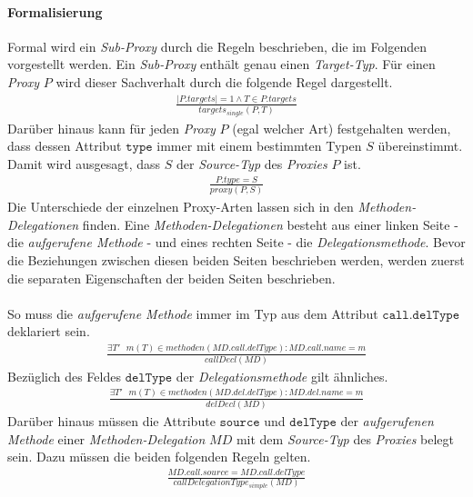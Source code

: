 \paragraph{Formalisierung}
Formal wird ein \emph{Sub-Proxy} durch die Regeln beschrieben, die im Folgenden vorgestellt werden. Ein \emph{Sub-Proxy} enthält genau einen \emph{Target-Typ}. Für einen \emph{Proxy} $P$ wird dieser Sachverhalt durch die folgende Regel dargestellt.
\begin{gather*}
\frac{|\mathit{P.targets}| = 1 \wedge T \in \mathit{P.targets}}{\mathit{targets_{single}(P,T)}}
\end{gather*}
\noindent
Darüber hinaus kann für jeden \emph{Proxy} $P$ (egal welcher Art) festgehalten werden, dass dessen Attribut $\texttt{type}$ immer mit einem bestimmten Typen $S$ übereinstimmt. Damit wird ausgesagt, dass $S$ der \emph{Source-Typ} des \emph{Proxies} $P$ ist.
\begin{gather*}
\frac{\mathit{P.type} = \mathit{S}}{\mathit{proxy(P,S)}}
\end{gather*}
\noindent
Die Unterschiede der einzelnen Proxy-Arten lassen sich in den \emph{Methoden-Delegationen} finden. Eine \emph{Methoden-Delegationen} besteht aus einer linken Seite - die \emph{aufgerufene Methode} - und eines rechten Seite - die \emph{Delegationsmethode}. Bevor die Beziehungen zwischen diesen beiden Seiten beschrieben werden, werden zuerst die separaten Eigenschaften der beiden Seiten beschrieben.
\\\\
So muss die \emph{aufgerufene Methode} immer im Typ aus dem Attribut $\texttt{call.delType}$ deklariert sein.
\begin{gather*}
\frac{\exists \mathit{T'\text{ } m(T)} \in \mathit{methoden(MD.call.delType)}: \mathit{MD.call.name} = m}
{\mathit{callDecl(MD)}}
\end{gather*}
\noindent
Bezüglich des Feldes $\texttt{delType}$ der \emph{Delegationsmethode} gilt ähnliches.
\begin{gather*}
\frac{\exists \mathit{T'\text{ }m(T)} \in \mathit{methoden(MD.del.delType)}: \mathit{MD.del.name} = m}
{\mathit{delDecl(MD)}}
\end{gather*}
\noindent
Darüber hinaus müssen die Attribute $\texttt{source}$ und $\texttt{delType}$ der \emph{aufgerufenen Methode} einer \emph{Methoden-Delegation} $\mathit{MD}$ mit dem \emph{Source-Typ} des \emph{Proxies} belegt sein. Dazu müssen die beiden folgenden Regeln gelten.
\begin{gather*}
\frac{\mathit{MD.call.source} = \mathit{MD.call.delType}}
{\mathit{callDelegationType_{simple}(MD)}}
\end{gather*}
